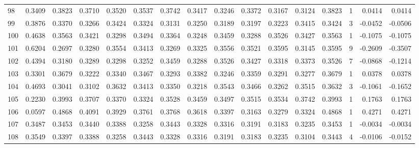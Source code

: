 \begin{tabular}{lrrrrrrrrrrrrrrr}
98  &      0.3409 &  0.3823 &  0.3710 &  0.3520 &  0.3537 &  0.3742 &  0.3417 &  0.3246 &  0.3372 &  0.3167 &   0.3124 &     0.3823 &      1 &                    0.0414 &                     0.0414 \\
99  &      0.3876 &  0.3370 &  0.3266 &  0.3424 &  0.3324 &  0.3131 &  0.3250 &  0.3189 &  0.3197 &  0.3223 &   0.3415 &     0.3424 &      3 &                   -0.0452 &                    -0.0506 \\
100 &      0.4638 &  0.3563 &  0.3421 &  0.3298 &  0.3494 &  0.3364 &  0.3248 &  0.3459 &  0.3288 &  0.3526 &   0.3427 &     0.3563 &      1 &                   -0.1075 &                    -0.1075 \\
101 &      0.6204 &  0.2697 &  0.3280 &  0.3554 &  0.3413 &  0.3269 &  0.3325 &  0.3556 &  0.3521 &  0.3595 &   0.3145 &     0.3595 &      9 &                   -0.2609 &                    -0.3507 \\
102 &      0.4394 &  0.3180 &  0.3289 &  0.3298 &  0.3252 &  0.3459 &  0.3288 &  0.3526 &  0.3427 &  0.3318 &   0.3373 &     0.3526 &      7 &                   -0.0868 &                    -0.1214 \\
103 &      0.3301 &  0.3679 &  0.3222 &  0.3340 &  0.3467 &  0.3293 &  0.3382 &  0.3246 &  0.3359 &  0.3291 &   0.3277 &     0.3679 &      1 &                    0.0378 &                     0.0378 \\
104 &      0.4693 &  0.3041 &  0.3102 &  0.3632 &  0.3413 &  0.3350 &  0.3218 &  0.3543 &  0.3466 &  0.3262 &   0.3515 &     0.3632 &      3 &                   -0.1061 &                    -0.1652 \\
105 &      0.2230 &  0.3993 &  0.3707 &  0.3370 &  0.3324 &  0.3528 &  0.3459 &  0.3497 &  0.3515 &  0.3534 &   0.3742 &     0.3993 &      1 &                    0.1763 &                     0.1763 \\
106 &      0.0597 &  0.4868 &  0.4091 &  0.3929 &  0.3761 &  0.3768 &  0.3618 &  0.3397 &  0.3163 &  0.3279 &   0.3324 &     0.4868 &      1 &                    0.4271 &                     0.4271 \\
107 &      0.3487 &  0.3453 &  0.3440 &  0.3388 &  0.3258 &  0.3443 &  0.3328 &  0.3316 &  0.3191 &  0.3183 &   0.3235 &     0.3453 &      1 &                   -0.0034 &                    -0.0034 \\
108 &      0.3549 &  0.3397 &  0.3388 &  0.3258 &  0.3443 &  0.3328 &  0.3316 &  0.3191 &  0.3183 &  0.3235 &   0.3104 &     0.3443 &      4 &                   -0.0106 &                    -0.0152 \\

\end{tabular}
